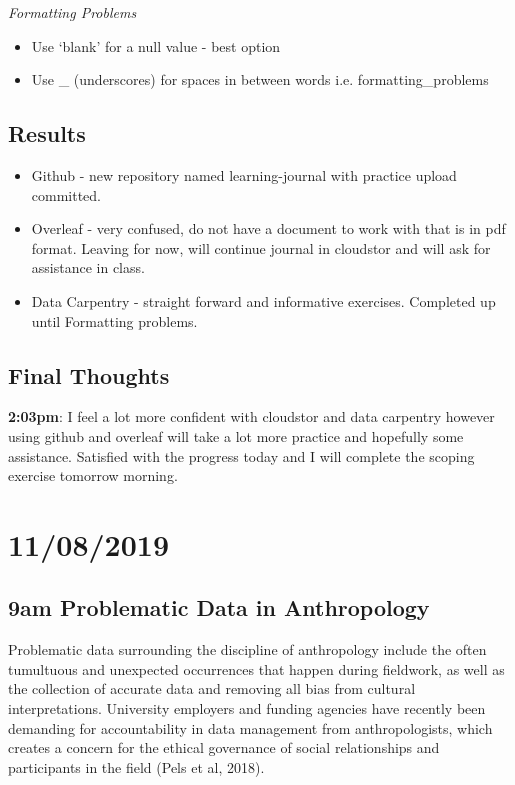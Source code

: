 \documentclass{article}
\begin{document}
\textit{Formatting Problems}

\begin{itemize}
\item Use ‘blank’ for a null value - best option
\item Use _ (underscores) for spaces in between words i.e. formatting_problems
\end{itemize}\subsection{Results}

\begin{itemize}
\item Github - new repository named learning-journal with practice upload committed. 
\item Overleaf - very confused, do not have a document to work with that is in pdf format. Leaving for now, will continue journal in cloudstor and will ask for assistance in class. 
\item Data Carpentry - straight forward and informative exercises. Completed up until Formatting problems.
\end{itemize}

\subsection{Final Thoughts}

\textbf{2:03pm}: I feel a lot more confident with cloudstor and data carpentry however using github and overleaf will take a lot more practice and hopefully some assistance. Satisfied with the progress today and I will complete the scoping exercise tomorrow morning.


\section{11/08/2019}

\subsection{9am Problematic Data in Anthropology}

Problematic data surrounding the discipline of anthropology include the often tumultuous and unexpected occurrences that happen during fieldwork, as well as the collection of accurate data and removing all bias from cultural interpretations. University employers and funding agencies have recently been demanding for accountability in data management from anthropologists, which creates a concern for the ethical governance of social relationships and participants in the field (Pels et al, 2018).
\end{document}
